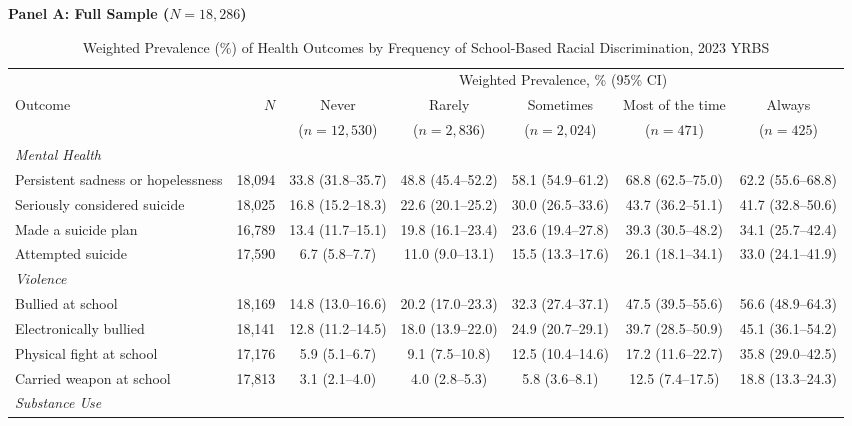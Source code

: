 \documentclass[12pt]{article}
\begin{document}
\begin{landscape}
\begin{table}[p]
\centering
\caption{Weighted Prevalence (\%) of Health Outcomes by Frequency of School-Based Racial Discrimination, 2023 YRBS}
\label{tab:main}
\footnotesize
\renewcommand{\arraystretch}{0.88}

\textbf{Panel A: Full Sample ($N = 18,286$)}
\vspace{4pt}

\begin{tabular}{l r ccccc}
\toprule
 & & \multicolumn{5}{c}{Weighted Prevalence, \% (95\% CI)} \\
\cmidrule(lr){3-7}
Outcome & $N$ & Never & Rarely & Sometimes & Most of the time & Always \\
 & & ($n = 12,530$) & ($n = 2,836$) & ($n = 2,024$) & ($n = 471$) & ($n = 425$) \\
\midrule
\textit{Mental Health} \\
\quad Persistent sadness or hopelessness & 18,094 & 33.8 (31.8--35.7) & 48.8 (45.4--52.2) & 58.1 (54.9--61.2) & 68.8 (62.5--75.0) & 62.2 (55.6--68.8) \\
\quad Seriously considered suicide & 18,025 & 16.8 (15.2--18.3) & 22.6 (20.1--25.2) & 30.0 (26.5--33.6) & 43.7 (36.2--51.1) & 41.7 (32.8--50.6) \\
\quad Made a suicide plan & 16,789 & 13.4 (11.7--15.1) & 19.8 (16.1--23.4) & 23.6 (19.4--27.8) & 39.3 (30.5--48.2) & 34.1 (25.7--42.4) \\
\quad Attempted suicide & 17,590 & 6.7 (5.8--7.7) & 11.0 (9.0--13.1) & 15.5 (13.3--17.6) & 26.1 (18.1--34.1) & 33.0 (24.1--41.9) \\
\addlinespace[4pt]
\textit{Violence} \\
\quad Bullied at school & 18,169 & 14.8 (13.0--16.6) & 20.2 (17.0--23.3) & 32.3 (27.4--37.1) & 47.5 (39.5--55.6) & 56.6 (48.9--64.3) \\
\quad Electronically bullied & 18,141 & 12.8 (11.2--14.5) & 18.0 (13.9--22.0) & 24.9 (20.7--29.1) & 39.7 (28.5--50.9) & 45.1 (36.1--54.2) \\
\quad Physical fight at school & 17,176 & 5.9 (5.1--6.7) & 9.1 (7.5--10.8) & 12.5 (10.4--14.6) & 17.2 (11.6--22.7) & 35.8 (29.0--42.5) \\
\quad Carried weapon at school & 17,813 & 3.1 (2.1--4.0) & 4.0 (2.8--5.3) & 5.8 (3.6--8.1) & 12.5 (7.4--17.5) & 18.8 (13.3--24.3) \\
\addlinespace[4pt]
\textit{Substance Use} \\

\end{tabular}
\end{table}
\end{landscape}
\end{document}
